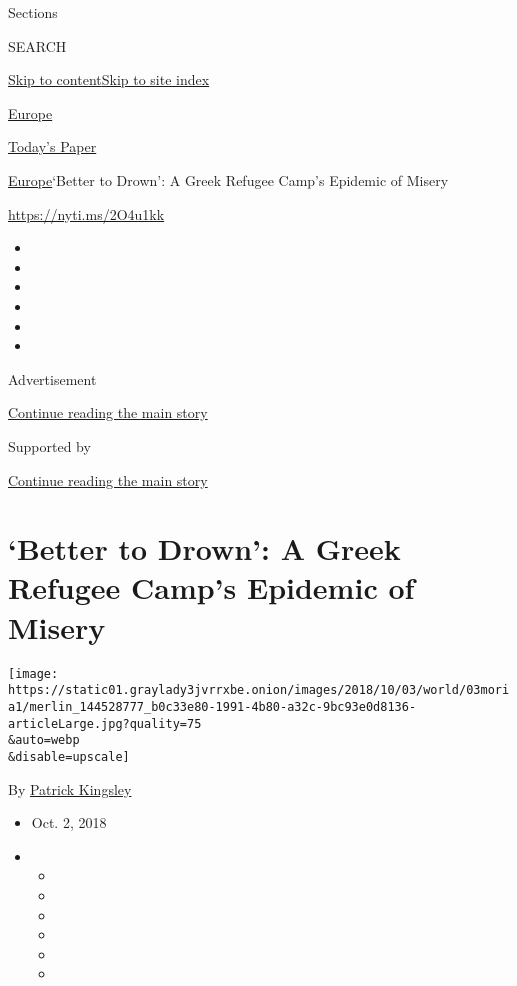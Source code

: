 Sections

SEARCH

\protect\hyperlink{site-content}{Skip to
content}\protect\hyperlink{site-index}{Skip to site index}

\href{https://www.nytimes3xbfgragh.onion/section/world/europe}{Europe}

\href{https://myaccount.nytimes3xbfgragh.onion/auth/login?response_type=cookie\&client_id=vi}{}

\href{https://www.nytimes3xbfgragh.onion/section/todayspaper}{Today's
Paper}

\href{/section/world/europe}{Europe}\textbar{}`Better to Drown': A Greek
Refugee Camp's Epidemic of Misery

\url{https://nyti.ms/2O4u1kk}

\begin{itemize}
\item
\item
\item
\item
\item
\item
\end{itemize}

Advertisement

\protect\hyperlink{after-top}{Continue reading the main story}

Supported by

\protect\hyperlink{after-sponsor}{Continue reading the main story}

\hypertarget{better-to-drown-a-greek-refugee-camps-epidemic-of-misery}{%
\section{`Better to Drown': A Greek Refugee Camp's Epidemic of
Misery}\label{better-to-drown-a-greek-refugee-camps-epidemic-of-misery}}

\texttt{[image: https://static01.graylady3jvrrxbe.onion/images/2018/10/03/world/03moria1/merlin\_144528777\_b0c33e80-1991-4b80-a32c-9bc93e0d8136-articleLarge.jpg?quality=75\\\&auto=webp\\\&disable=upscale]}

By \href{https://www.nytimes3xbfgragh.onion/by/patrick-kingsley}{Patrick
Kingsley}

\begin{itemize}
\item
  Oct. 2, 2018
\item
  \begin{itemize}
  \item
  \item
  \item
  \item
  \item
  \item
  \end{itemize}
\end{itemize}

